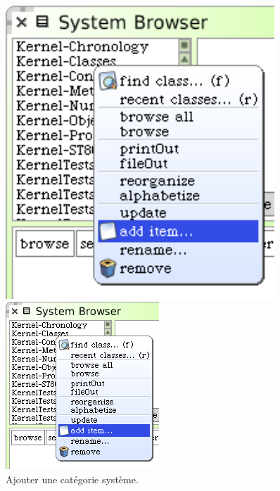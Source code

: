 \documentclass[a4paper,10pt,twoside]{book}
\begin{document}
\begin{figure}[htb]
\begin{minipage}[b]{0.48\textwidth}
\ifluluelse
	{\centerline {\includegraphics[width=0.9\textwidth]{AddCategory}}}
	{\centerline {\includegraphics[scale=0.7]{AddCategory}}}
	\caption{Ajouter une cat\'egorie système.
	\label{fig:addCategory}}
\end{minipage}
\hfill
\begin{minipage}[b]{0.48\textwidth}
\ifluluelse

\end{minipage}
\end{figure}
\end{document}
